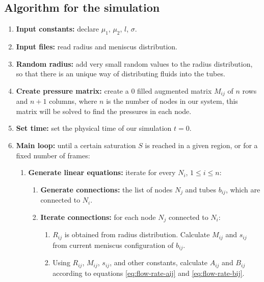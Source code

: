 \subsection{Algorithm for the simulation} \label{sec:detailed-algorithm}
	\begin{enumerate}
		\item \textbf{Input constants:} declare ${\mu}_{1}$, ${\mu}_{2}$, $l$, $\sigma$.
		
		\item \textbf{Input files:} read radius and meniscus distribution.
		
		\item \textbf{Random radius:} add very small random values to the radius distribution, so that there is an unique way of distributing fluids into the tubes.
		
		\item \textbf{Create pressure matrix:} create a 0 filled augmented matrix $M_{ij}$ of $n$ rows and $n + 1$ columns, where $n$ is the number of nodes in our system, this matrix will be solved to find the pressures in each node.
		
		\item \textbf{Set time:} set the physical time of our simulation $t = 0$.
		\item \textbf{Main loop:} until a certain saturation $S$ is reached in a given region, or for a fixed number of frames:
		\begin{enumerate}
			\item \textbf{Generate linear equations:} iterate for every $N_i$, $1 \le i \le n$:
			
			\begin{enumerate}
				\item \textbf{Generate connections:} the list of nodes $N_j$ and tubes $b_{ij}$, which are connected to $N_i$.
				
				\item \textbf{Iterate connections:} for each node $N_j$ connected to $N_i$:
				
				\begin{enumerate}
					\item $R_{ij}$ is obtained from radius distribution. Calculate $M_{ij}$ and $s_{ij}$ from current meniscus configuration of $b_{ij}$.
					
					\item Using $R_{ij}$, $M_{ij}$, $s_{ij}$, and other constants, calculate $A_{ij}$ and $B_{ij}$ according to equations \ref{eq:flow-rate-aij} and \ref{eq:flow-rate-bij}.
					

\end{enumerate}
\end{enumerate}
\end{enumerate}
\end{enumerate}
